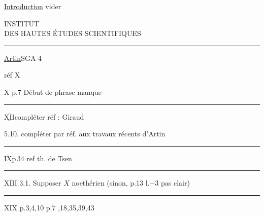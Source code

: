 \uline{Introduction} vider

\begin{center}
INSTITUT\\
DES HAUTES ÉTUDES SCIENTIFIQUES\\
\rule{2.3em}{0.4pt}
\end{center}

\uline{Artin}\qquad SGA 4

réf \quad X \quad [1]

X \qquad p.7 \qquad Début de phrase manque

\noindent\rule{\linewidth}{0.4pt}

$\underline{\overline{\mathrm{XII}}}$\qquad compléter réf : Giraud

5.10. \qquad compléter  par réf. aux travaux récents d'Artin

\noindent\rule{.32\linewidth}{0.4pt}

$\underline{\overline{\mathrm{IX}}}$\qquad p\,34 \qquad ref th. de Tsen

\noindent\rule{.6\linewidth}{0.4pt}

$\underline{\overline{\mathrm{XIII}}}$\qquad {} 3.1. \qquad Supposer $X$ noethérien (sinon, p.13 l.$-3$ pas clair)

\noindent\rule{.42\linewidth}{0.4pt}

XIX \qquad p.3,4,10 \qquad p.7 ,18,35,39,43
